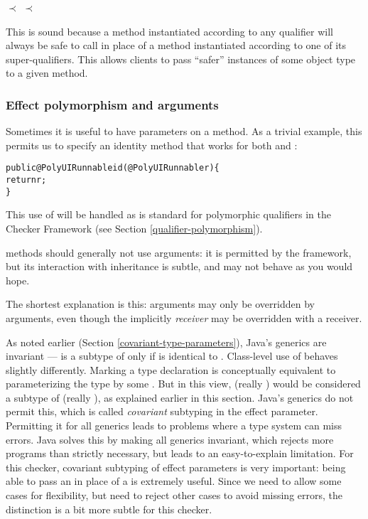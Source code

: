 \centerline{ $\prec$  $\prec$ }

\noindent
This is sound because a method instantiated according to any qualifier will always be
safe to call in place of a method instantiated according to one of its super-qualifiers.
This allows clients to pass ``safer'' instances of some object type to a given method.

\subsubsection{Effect polymorphism and arguments}
Sometimes it is useful to have  parameters on a method.  As a trivial example, this
permits us to specify an identity method that works for both  and
:

\begin{alltt}
public @PolyUI Runnable id(@PolyUI Runnable r) \{
    return r;
\}
\end{alltt}

\noindent
This use of  will be handled as is standard for polymorphic qualifiers in the Checker
Framework (see Section \ref{qualifier-polymorphism}).

 methods should generally not use  arguments: it is permitted by
the framework, but its interaction with inheritance is subtle, and may not behave as you would
hope.

The shortest explanation is this:  arguments may only be overridden by 
arguments, even though the implicitly  \emph{receiver} may be overridden with a
 receiver.

As noted earlier (Section \ref{covariant-type-parameters}), Java's generics are invariant ---
 is a subtype of  only if  is identical to .
Class-level use of  behaves slightly differently.
Marking a type declaration  is conceptually
equivalent to parameterizing the type by some .  But in this view,
 (really ) would be considered a subtype of
 (really ), as explained earlier in this section.  Java's
generics do not permit this, which is called \emph{covariant} subtyping in the effect parameter.
Permitting it for all generics leads to problems where a type system can miss errors.  Java solves
this by making all generics invariant, which rejects more programs than strictly necessary, but
leads to an easy-to-explain limitation.  For this checker, covariant subtyping of effect parameters
is very important: being able to pass an  in place of a  is extremely useful.  Since we need to allow some
cases for flexibility, but need to reject other cases to avoid missing errors, the distinction is a
bit more subtle for this checker.

